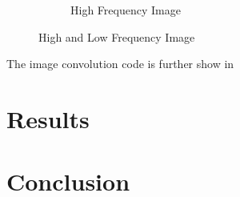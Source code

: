 \documentclass[a4paper,12pt]{article}
\begin{document}
\begin{figure}[h!]
\begin{subfigure}{0.4\textwidth}
			\caption{High Frequency Image}
			\label{fig:high_freq}
		\end{subfigure}
		\caption{High and Low Frequency Image}
		\label{fig:uni_gauss}
	\end{figure}
	The image convolution code is further show in 
\section{Results}
\section{Conclusion}
\end{document}
